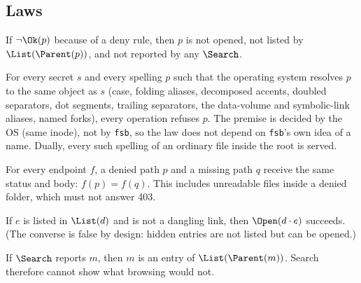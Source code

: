 \subsection{Laws}

\begin{law}
\label{law:absent}
If $\neg\Ok(p)$ because of a deny rule, then $p$ is not opened, not listed by
$\List(\Parent(p))$, and not reported by any $\Search$.
\end{law}

\begin{law}
\label{law:differential}
For every secret $s$ and every spelling $p$ such that the operating system
resolves $p$ to the same object as $s$ (case, folding aliases, decomposed accents,
doubled separators, dot segments, trailing separators, the data-volume and
symbolic-link aliases, named forks), every operation refuses $p$.  The premise is
decided by the OS (same inode), not by \texttt{fsb}, so the law does not depend on
\texttt{fsb}'s own idea of a name.  Dually, every such spelling of an ordinary file
inside the root is served.
\end{law}

\begin{law}
\label{law:indist}
For every endpoint $f$, a denied path $p$ and a missing path $q$ receive the
same status and body: $f(p)=f(q)$.  This includes unreadable files inside a
denied folder, which must not answer 403.
\end{law}

\begin{law}
\label{law:listed-open}
If $e$ is listed in $\List(d)$ and is not a dangling link, then $\Open(d\cdot e)$
succeeds.  (The converse is false by design: hidden entries are not listed but
can be opened.)
\end{law}

\begin{law}
\label{law:found-listed}
If $\Search$ reports $m$, then $m$ is an entry of $\List(\Parent(m))$.  Search
therefore cannot show what browsing would not.
\end{law}

